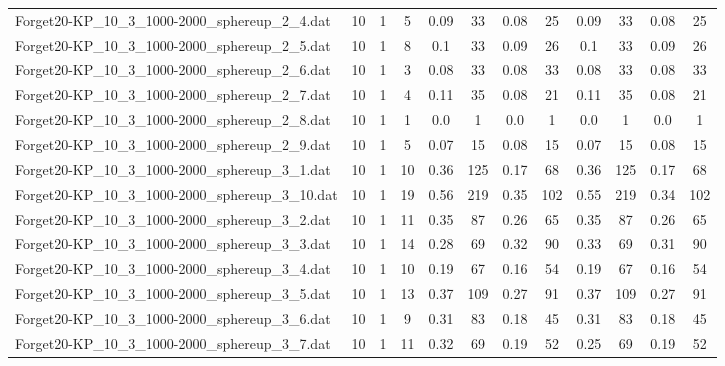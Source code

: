 \begin{sidewaystable}[!ht]
{\begin{tabular}{lccccccccccc}
Forget20-KP\_10\_3\_1000-2000\_sphereup\_2\_4.dat & 10 & 1 & 5 & 0.09 & 33 &  \textcolor{blue2}{0.08} & 25 & 0.09 & 33 &  \textcolor{blue2}{0.08} & 25 \\
Forget20-KP\_10\_3\_1000-2000\_sphereup\_2\_5.dat & 10 & 1 & 8 & 0.1 & 33 &  \textcolor{blue2}{0.09} & 26 & 0.1 & 33 &  \textcolor{blue2}{0.09} & 26 \\
Forget20-KP\_10\_3\_1000-2000\_sphereup\_2\_6.dat & 10 & 1 & 3 &  \textcolor{blue2}{0.08} & 33 &  \textcolor{blue2}{0.08} & 33 &  \textcolor{blue2}{0.08} & 33 &  \textcolor{blue2}{0.08} & 33 \\
Forget20-KP\_10\_3\_1000-2000\_sphereup\_2\_7.dat & 10 & 1 & 4 & 0.11 & 35 &  \textcolor{blue2}{0.08} & 21 & 0.11 & 35 &  \textcolor{blue2}{0.08} & 21 \\
Forget20-KP\_10\_3\_1000-2000\_sphereup\_2\_8.dat & 10 & 1 & 1 &  \textcolor{blue2}{0.0} & 1 &  \textcolor{blue2}{0.0} & 1 &  \textcolor{blue2}{0.0} & 1 &  \textcolor{blue2}{0.0} & 1 \\
Forget20-KP\_10\_3\_1000-2000\_sphereup\_2\_9.dat & 10 & 1 & 5 &  \textcolor{blue2}{0.07} & 15 & 0.08 & 15 &  \textcolor{blue2}{0.07} & 15 & 0.08 & 15 \\
Forget20-KP\_10\_3\_1000-2000\_sphereup\_3\_1.dat & 10 & 1 & 10 & 0.36 & 125 &  \textcolor{blue2}{0.17} & 68 & 0.36 & 125 &  \textcolor{blue2}{0.17} & 68 \\
Forget20-KP\_10\_3\_1000-2000\_sphereup\_3\_10.dat & 10 & 1 & 19 & 0.56 & 219 & 0.35 & 102 & 0.55 & 219 &  \textcolor{blue2}{0.34} & 102 \\
Forget20-KP\_10\_3\_1000-2000\_sphereup\_3\_2.dat & 10 & 1 & 11 & 0.35 & 87 &  \textcolor{blue2}{0.26} & 65 & 0.35 & 87 &  \textcolor{blue2}{0.26} & 65 \\
Forget20-KP\_10\_3\_1000-2000\_sphereup\_3\_3.dat & 10 & 1 & 14 &  \textcolor{blue2}{0.28} & 69 & 0.32 & 90 & 0.33 & 69 & 0.31 & 90 \\
Forget20-KP\_10\_3\_1000-2000\_sphereup\_3\_4.dat & 10 & 1 & 10 & 0.19 & 67 &  \textcolor{blue2}{0.16} & 54 & 0.19 & 67 &  \textcolor{blue2}{0.16} & 54 \\
Forget20-KP\_10\_3\_1000-2000\_sphereup\_3\_5.dat & 10 & 1 & 13 & 0.37 & 109 &  \textcolor{blue2}{0.27} & 91 & 0.37 & 109 &  \textcolor{blue2}{0.27} & 91 \\
Forget20-KP\_10\_3\_1000-2000\_sphereup\_3\_6.dat & 10 & 1 & 9 & 0.31 & 83 &  \textcolor{blue2}{0.18} & 45 & 0.31 & 83 &  \textcolor{blue2}{0.18} & 45 \\
Forget20-KP\_10\_3\_1000-2000\_sphereup\_3\_7.dat & 10 & 1 & 11 & 0.32 & 69 &  \textcolor{blue2}{0.19} & 52 & 0.25 & 69 &  \textcolor{blue2}{0.19} & 52 \\

\end{tabular}}
\end{sidewaystable}
